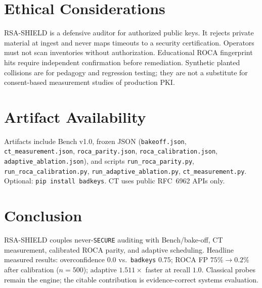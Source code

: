\documentclass[conference]{IEEEtran}
\begin{document}
\section{Ethical Considerations}
RSA-SHIELD is a defensive auditor for authorized public keys. It rejects private material at ingest and never maps timeouts to a security certification. Operators must not scan inventories without authorization. Educational ROCA fingerprint hits require independent confirmation before remediation. Synthetic planted collisions are for pedagogy and regression testing; they are not a substitute for consent-based measurement studies of production PKI.

\section{Artifact Availability}
Artifacts include Bench v1.0, frozen JSON (\texttt{bakeoff.json}, \texttt{ct\_measurement.json}, \texttt{roca\_parity.json}, \texttt{roca\_calibration.json}, \texttt{adaptive\_ablation.json}), and scripts \texttt{run\_roca\_parity.py}, \texttt{run\_roca\_calibration.py}, \texttt{run\_adaptive\_ablation.py}, \texttt{ct\_measurement.py}. Optional: \texttt{pip install badkeys}. CT uses public RFC~6962 APIs only.

\section{Conclusion}
RSA-SHIELD couples never-\texttt{SECURE} auditing with Bench/bake-off, CT measurement, calibrated ROCA parity, and adaptive scheduling. Headline measured results: overconfidence $0.0$ vs.\ \texttt{badkeys} $0.75$; ROCA FP $75\%\!\rightarrow\!0.2\%$ after calibration ($n{=}500$); adaptive $1.511\times$ faster at recall $1.0$. Classical probes remain the engine; the citable contribution is evidence-correct systems evaluation.



\end{document}
